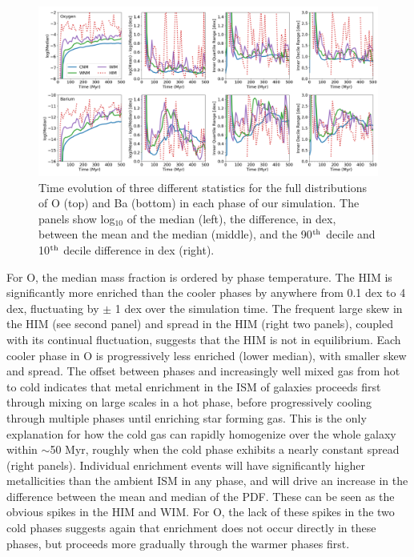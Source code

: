 \documentclass[twocolumn]{aastex61}
\begin{document}
\begin{figure}
\centering
\includegraphics[width=0.95\linewidth]{O_Ba_distribution_evolution.png}
\caption{Time evolution of three different statistics for the full distributions of O (top) and Ba (bottom) in each phase of our simulation. The panels show log$_{10}$ of the median (left), the difference, in dex, between the mean and the median (middle), and the 90$^{\rm th}$ decile and 10$^{\rm th}$ decile difference in dex (right).}
\label{fig:phase-statistics}
\end{figure}

For O, the median mass fraction is ordered by phase temperature. The HIM is significantly more enriched than the cooler phases by anywhere from 0.1 dex to 4 dex, fluctuating by $\pm$ 1 dex over the simulation time. The frequent large skew in the HIM (see second panel) and spread in the HIM (right two panels), coupled with its continual fluctuation, suggests that the HIM is not in equilibrium.
Each cooler phase in O is progressively less enriched (lower median), with smaller skew and spread. The offset between phases and increasingly well mixed gas from hot to cold indicates that metal enrichment in the ISM of galaxies proceeds first through mixing on large scales in a hot phase, before progressively cooling through multiple phases until enriching star forming gas. This is the only explanation for how the cold gas can rapidly homogenize over the whole galaxy within $\sim$50 Myr, roughly when the cold phase exhibits a nearly constant spread (right panels). Individual enrichment events will have significantly higher metallicities than the ambient ISM in any phase, and will drive an increase in the difference between the mean and median of the PDF. These can be seen as the obvious spikes in the HIM and WIM. For O, the lack of these spikes in the two cold phases suggests again that enrichment does not occur directly in these phases, but proceeds more gradually through the warmer phases first.
\end{document}
